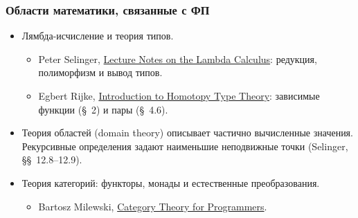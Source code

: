 \documentclass[11pt]{beamer}
\begin{document}
\begin{frame}[fragile]
  \frametitle{Области математики, связанные с ФП}
  \begin{itemize}
    \item Лямбда-исчисление и теория типов.
          \begin{itemize}
            \item Peter Selinger, \href{https://arxiv.org/abs/0804.3434}{Lecture Notes on the Lambda Calculus}: редукция, полиморфизм и вывод типов.
            \item Egbert Rijke, \href{https://arxiv.org/abs/2212.11082}{Introduction to Homotopy Type Theory}: зависимые функции (§~2) и пары (§~4.6).
          \end{itemize}
          \pause
    \item Теория областей (domain theory) описывает частично вычисленные значения. Рекурсивные определения задают наименьшие неподвижные точки (Selinger, §§~12.8--12.9).
          \pause
    \item Теория категорий: функторы, монады и естественные преобразования.
          \begin{itemize}
            \item Bartosz Milewski, \href{https://github.com/hmemcpy/milewski-ctfp-pdf}{Category Theory for Programmers}.
          \end{itemize}
  \end{itemize}
\end{frame}
\end{document}
